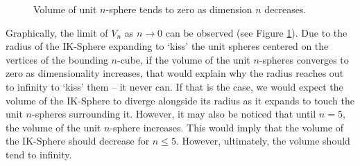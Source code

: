 \begin{figure}[H]
    \centering
    \caption{Volume of unit $n$-sphere tends to zero as dimension $n$ decreases.}
    \label{fig:unit sphere volume graph}
\end{figure}

Graphically, the limit of $V_n$ as $n \to 0$ can be observed (see Figure \ref{fig:unit sphere volume graph}). Due to the radius of the IK-Sphere expanding to `kiss' the unit spheres centered on the vertices of the bounding $n$-cube, if the volume of the unit $n$-spheres converges to zero as dimensionality increases, that would explain why the radius reaches out to infinity to `kiss' them -- it never can. If that is the case, we would expect the volume of the IK-Sphere to diverge alongside its radius as it expands to touch the unit $n$-spheres surrounding it. However, it may also be noticed that until $n=5$, the volume of the unit $n$-sphere increases. This would imply that the volume of the IK-Sphere should decrease for $n\leq 5$. However, ultimately, the volume should tend to infinity.

